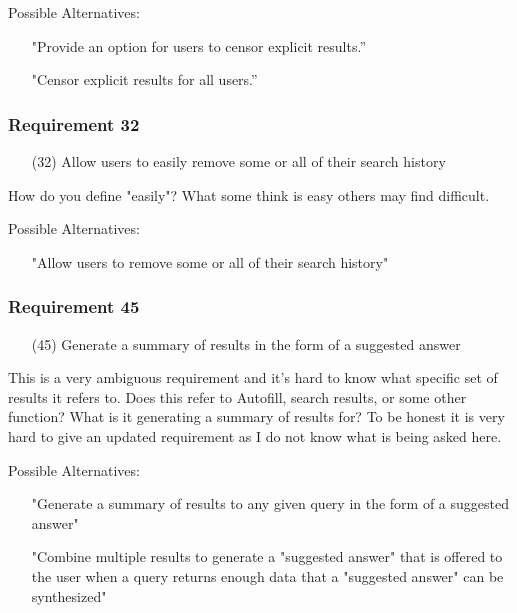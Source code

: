 \medskip

Possible Alternatives:
\begin{itemize}
  \item[] "Provide an option for users to censor explicit results.”
  \item[] "Censor explicit results for all users.”
\end{itemize}

\subsubsection*{Requirement 32}
\begin{itemize}
  \item[(32)] Allow users to easily remove some or all of their search history
\end{itemize}

How do you define "easily"? What some think is easy others may find difficult.

\medskip

Possible Alternatives:
\begin{itemize}
  \item[] "Allow users to remove some or all of their search history"
\end{itemize}

\subsubsection*{Requirement 45}
\begin{itemize}
  \item[(45)] Generate a summary of results in the form of a suggested answer
\end{itemize}

This is a very ambiguous requirement and it's hard to know what specific set of results it refers to. Does this refer to Autofill, search results, or some other function? What is it generating a summary of results for? To be honest it is very hard to give an updated requirement as I do not know what is being asked here. 

\medskip

Possible Alternatives:
\begin{itemize}
  \item[] "Generate a summary of results to any given query in the form of a suggested answer"
  \item[] "Combine multiple results to generate a "suggested answer" that is offered to the user when a query returns enough data that a "suggested answer" can be synthesized"
\end{itemize}


